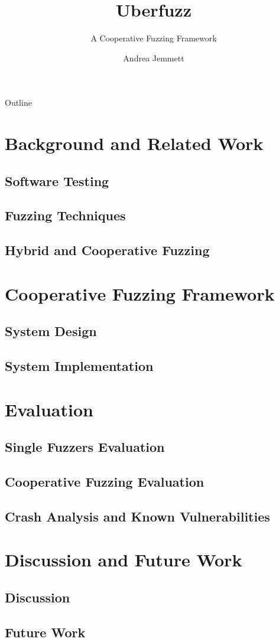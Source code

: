 \documentclass{beamer}
\title{Uberfuzz}
\subtitle{A Cooperative Fuzzing Framework}
\author{Andrea Jemmett}
\institute[VU]{Vrije Universiteit Amsterdam}
\begin{document}
\frame{\titlepage}

\begin{frame}{Outline}
    \tableofcontents[pausesections]
\end{frame}

\section{Background and Related Work}

\subsection{Software Testing}

\subsection{Fuzzing Techniques}

\subsection{Hybrid and Cooperative Fuzzing}

\section{Cooperative Fuzzing Framework}

\subsection{System Design}

\subsection{System Implementation}

\section{Evaluation}

\subsection{Single Fuzzers Evaluation}

\subsection{Cooperative Fuzzing Evaluation}

\subsection{Crash Analysis and Known Vulnerabilities}

\section{Discussion and Future Work}

\subsection*{Discussion}

\subsection*{Future Work}
\end{document}
